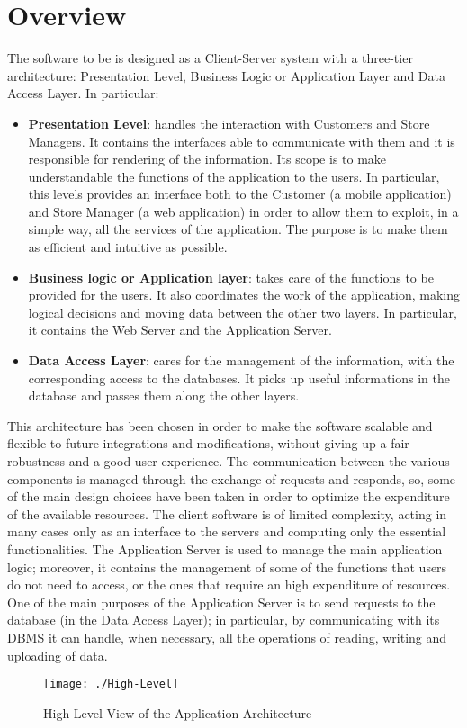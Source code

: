 \section{Overview}

The software to be is designed as a Client-Server system with a three-tier architecture: Presentation Level, Business Logic or Application Layer and Data Access Layer. In particular:
\begin{itemize}
	\item \textbf{Presentation Level}: handles the interaction with Customers and Store Managers. It contains the interfaces able to communicate with them and it is responsible for rendering of the information. Its scope is to make understandable the functions of the application to the users. In particular, this levels provides an interface both to the Customer (a mobile application) and Store Manager (a web application) in order to allow them to exploit, in a simple way, all the services of the application. The purpose is to make them as efficient and intuitive as possible.

	\item \textbf{Business logic or Application layer}: takes care of the functions to be provided for the users. It also coordinates the work of the application, making logical decisions and moving data between the other two layers. In particular, it contains the Web Server and the Application Server.

	\item \textbf{Data Access Layer}: cares for the management of the information, with the corresponding access to the databases. It picks up useful informations in the database and passes them along the other layers.
\end{itemize}

This architecture has been chosen in order to make the software scalable and flexible to future integrations and modifications, without giving up a fair robustness and a good user experience. The communication between the various components is managed through the exchange of requests and responds, so, some of the main design choices have been taken in order to optimize the expenditure of the available resources. The client software is of limited complexity, acting in many cases only as an interface to the servers and computing only the essential functionalities. The Application Server is used to manage the main application logic; moreover, it contains the management of some of the functions that users do not need to access, or the ones that require an high expenditure of resources. One of the main purposes of the Application Server is to send requests to the database (in the Data Access Layer); in particular, by communicating with its DBMS it can handle, when necessary, all the operations of reading, writing and uploading of data.

\begin{figure}[H]
\centerline{\texttt{[image: ./High-Level]}}
\caption{High-Level View of the Application Architecture}
\end{figure}



